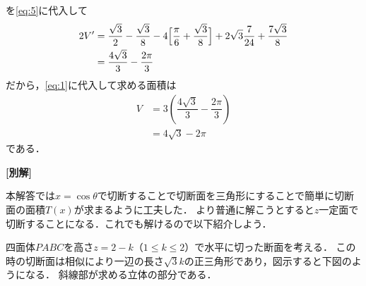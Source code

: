 \documentclass[../../main.tex]{subfiles}
\begin{document}
を\cref{eq:5}に代入して
\begin{align}
  2V'
  &= \dfrac{\sqrt{3}}{2} - \dfrac{\sqrt{3}}{8} - 4\Bigl[\dfrac{\pi}{6} + \dfrac{\sqrt{3}}{8}\Bigr] + 2\sqrt{3}\dfrac{7}{24} + \dfrac{7\sqrt{3}}{8} \\
  &= \dfrac{4\sqrt{3}}{3} - \dfrac{2\pi}{3}
\end{align}
だから，\cref{eq:1}に代入して求める面積は
\begin{align}
  V
  &= 3\left(\dfrac{4\sqrt{3}}{3} - \dfrac{2\pi}{3}\right) \\
  &=4\sqrt{3} - 2\pi
\end{align}
である．

{\bf [別解]}

本解答では$x=\cos\theta$で切断することで切断面を三角形にすることで簡単に切断面の面積$T(x)$が求まるように工夫した．
より普通に解こうとすると$z$一定面で切断することになる．これでも解けるので以下紹介しよう．

四面体$PABC$を高さ$z=2-k$（$1\le k \le2$）で水平に切った断面を考える．
この時の切断面は相似により一辺の長さ$\sqrt{3}k$の正三角形であり，図示すると下図のようになる．
斜線部が求める立体の部分である．
\end{document}
